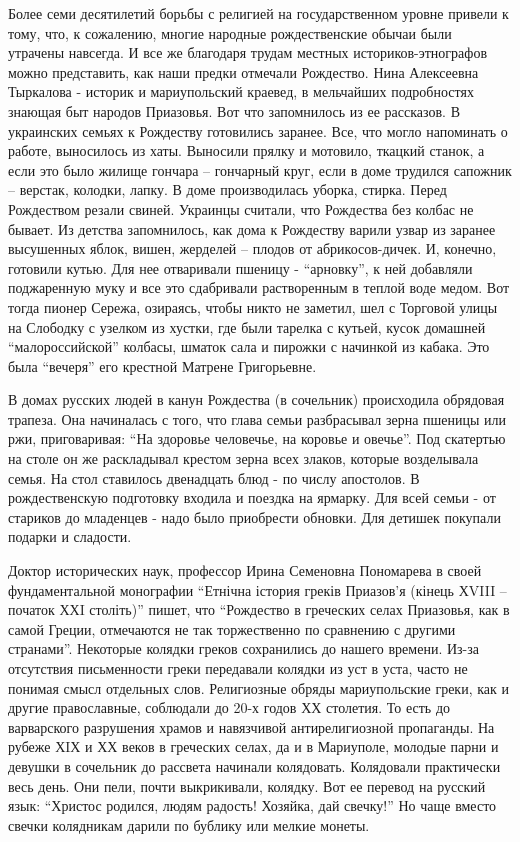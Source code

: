Более семи десятилетий борьбы с религией на государственном уровне привели к
тому, что, к сожалению, многие народные рождественские обычаи были утрачены
навсегда. И все же благодаря трудам местных историков-этнографов можно
представить, как наши предки отмечали Рождество.  Нина Алексеевна Тыркалова -
историк и мариупольский краевед, в мельчайших подробностях знающая быт народов
Приазовья.  Вот что запомнилось из ее рассказов. В украинских семьях к
Рождеству  готовились заранее. Все, что могло напоминать о работе, выносилось
из хаты. Выносили прялку и мотовило, ткацкий станок, а если это было жилище
гончара – гончарный круг, если в доме трудился сапожник – верстак, колодки,
лапку. В доме производилась уборка, стирка. Перед Рождеством резали свиней.
Украинцы считали, что Рождества без колбас не бывает. Из детства запомнилось,
как дома к Рождеству варили узвар из заранее высушенных яблок, вишен, жерделей
– плодов от абрикосов-дичек. И, конечно, готовили кутью. Для нее отваривали
пшеницу - \enquote{арновку}, к ней добавляли поджаренную муку и все это сдабривали
растворенным в теплой воде медом.  Вот тогда пионер Сережа, озираясь, чтобы
никто не заметил, шел с Торговой улицы на Слободку с узелком из хустки, где
были тарелка с кутьей, кусок домашней \enquote{малороссийской} колбасы, шматок сала и
пирожки с начинкой из кабака. Это была \enquote{вечеря} его крестной Матрене
Григорьевне.


В домах русских людей в канун Рождества (в сочельник) происходила обрядовая
трапеза. Она начиналась с того, что глава семьи разбрасывал зерна пшеницы или
ржи, приговаривая: \enquote{На здоровье человечье, на коровье и овечье}. Под скатертью
на столе он же раскладывал  крестом зерна всех злаков, которые возделывала
семья. На стол ставилось двенадцать блюд - по числу апостолов. В рождественскую
подготовку входила и поездка на ярмарку. Для всей семьи - от стариков до
младенцев - надо было приобрести обновки. Для детишек покупали  подарки и
сладости. 


Доктор исторических наук, профессор Ирина Семеновна Пономарева  в своей
фундаментальной монографии \enquote{Етнічна істория греків Приазов'я (кінець ХVIII –
початок ХХI століть)} пишет, что  \enquote{Рождество в греческих селах Приазовья, как в
самой Греции, отмечаются не так торжественно по сравнению с другими странами}.
Некоторые колядки греков сохранились  до нашего времени. Из-за отсутствия
письменности греки передавали колядки из уст в уста, часто не понимая смысл
отдельных слов. Религиозные обряды мариупольские греки, как и другие
православные,  соблюдали до 20-х годов ХХ столетия. То есть до варварского
разрушения храмов и навязчивой антирелигиозной пропаганды. На рубеже ХIХ и ХХ
веков в греческих селах, да и в Мариуполе, молодые парни и девушки в сочельник
до рассвета начинали колядовать. Колядовали практически весь день. Они пели,
почти выкрикивали, колядку. Вот ее перевод на русский язык: \enquote{Христос родился,
людям радость! Хозяйка, дай свечку!} Но чаще вместо свечки колядникам дарили по
бублику или мелкие монеты.

